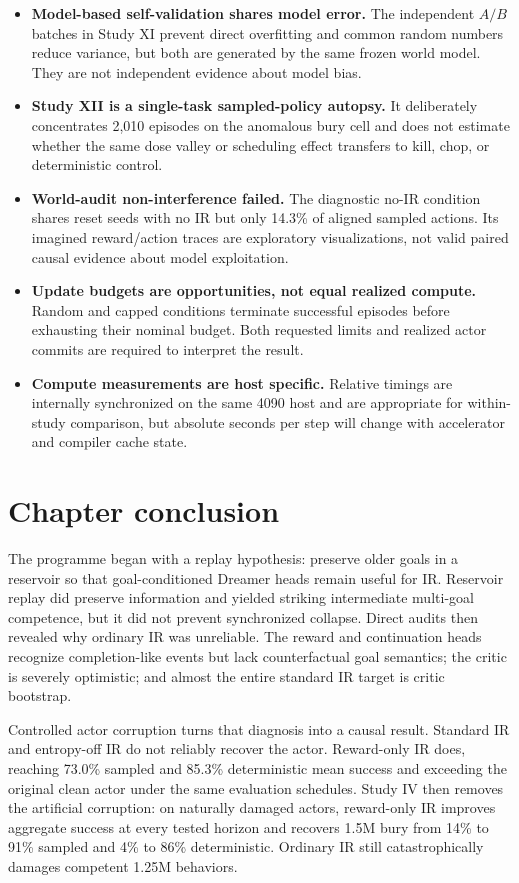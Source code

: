 \documentclass[10pt]{article}
\newcommand{\pct}[1]{#1\%}
\begin{document}
\begin{itemize}
  \item \textbf{Model-based self-validation shares model error.} The independent $A/B$ batches in Study XI prevent direct overfitting and common random numbers reduce variance, but both are generated by the same frozen world model. They are not independent evidence about model bias.
  \item \textbf{Study XII is a single-task sampled-policy autopsy.} It deliberately concentrates 2,010 episodes on the anomalous bury cell and does not estimate whether the same dose valley or scheduling effect transfers to kill, chop, or deterministic control.
  \item \textbf{World-audit non-interference failed.} The diagnostic no-IR condition shares reset seeds with no IR but only \pct{14.3} of aligned sampled actions. Its imagined reward/action traces are exploratory visualizations, not valid paired causal evidence about model exploitation.
  \item \textbf{Update budgets are opportunities, not equal realized compute.} Random and capped conditions terminate successful episodes before exhausting their nominal budget. Both requested limits and realized actor commits are required to interpret the result.
  \item \textbf{Compute measurements are host specific.} Relative timings are internally synchronized on the same 4090 host and are appropriate for within-study comparison, but absolute seconds per step will change with accelerator and compiler cache state.
\end{itemize}

\section{Chapter conclusion}

The programme began with a replay hypothesis: preserve older goals in a reservoir so that goal-conditioned Dreamer heads remain useful for IR. Reservoir replay did preserve information and yielded striking intermediate multi-goal competence, but it did not prevent synchronized collapse. Direct audits then revealed why ordinary IR was unreliable. The reward and continuation heads recognize completion-like events but lack counterfactual goal semantics; the critic is severely optimistic; and almost the entire standard IR target is critic bootstrap.

Controlled actor corruption turns that diagnosis into a causal result. Standard IR and entropy-off IR do not reliably recover the actor. Reward-only IR does, reaching \pct{73.0} sampled and \pct{85.3} deterministic mean success and exceeding the original clean actor under the same evaluation schedules. Study IV then removes the artificial corruption: on naturally damaged actors, reward-only IR improves aggregate success at every tested horizon and recovers 1.5M bury from \pct{14} to \pct{91} sampled and \pct{4} to \pct{86} deterministic. Ordinary IR still catastrophically damages competent 1.25M behaviors.
\end{document}
